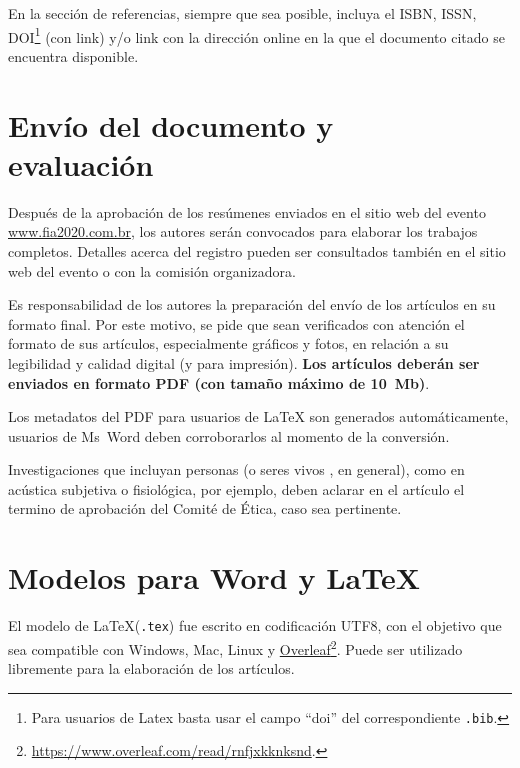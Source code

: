 \documentclass[12pt, a4paper, twoside, twocolumn]{article}
\begin{document}
En la sección de referencias, siempre que sea posible, incluya el ISBN, ISSN, DOI\footnote{Para usuarios de Latex basta usar el campo ``doi'' del correspondiente \texttt{.bib}.} (con link) y/o link con la dirección online en la que el documento citado se encuentra disponible.

\section{Envío del documento y\\ evaluación}

Después de la aprobación de los resúmenes enviados en el sitio web del evento \url{www.fia2020.com.br}, los autores serán convocados para elaborar los trabajos completos. Detalles acerca del registro pueden ser consultados también en el sitio web del evento o con la comisión organizadora.

Es responsabilidad de los autores la preparación del envío de los artículos en su formato final. Por este motivo, se pide que sean verificados con atención el formato de sus artículos, especialmente gráficos y fotos, en relación a su legibilidad y calidad digital (y para impresión). \textbf{Los artículos deberán ser enviados en formato PDF (con tamaño máximo de 10~Mb)}.

Los metadatos del PDF para usuarios de \LaTeX\xspace son generados automáticamente, usuarios de Ms~Word deben corroborarlos al momento de la conversión.

Investigaciones que incluyan personas (o seres vivos , en general), como en acústica subjetiva o fisiológica, por ejemplo, deben aclarar en el artículo el termino de aprobación del Comité de Ética, caso sea pertinente.

\section{Modelos para Word y \LaTeX}

El modelo de \LaTeX\xspace (\texttt{.tex}) fue escrito en codificación UTF8, con el objetivo que sea compatible con Windows, Mac, Linux y \href{https://www.overleaf.com/read/rnfjxkknksnd}{Overleaf}\footnote{\url{https://www.overleaf.com/read/rnfjxkknksnd}.}. Puede ser utilizado libremente para la elaboración de los artículos.
\end{document}
